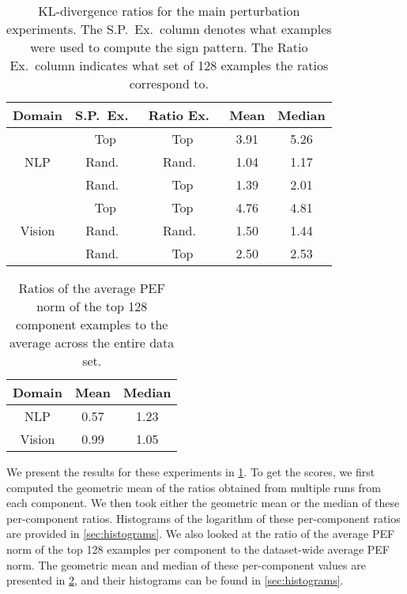 \documentclass[dvipsnames]{article}
\begin{document}
\begin{table}[t]
\caption{%
KL-divergence ratios for the main perturbation experiments. The S.P.\ Ex.\ column denotes what examples were used to compute the sign pattern. The Ratio Ex.\ column indicates what set of 128 examples the ratios correspond to.}
\label{table:h_kl_ratios}
\vskip 0.15in
\begin{center}
\begin{small}
\begin{sc}
\begin{tabular}{ccccc}
\toprule
Domain & S.P.\ Ex.\ & Ratio Ex.\ & Mean & Median \\
\midrule
  & Top & Top & 3.91 & 5.26 \\
NLP & Rand.\ & Rand.\ & 1.04 & 1.17 \\
 & Rand.\ & Top & 1.39 & 2.01 \\
\midrule
  & Top & Top & 4.76 & 4.81 \\
Vision & Rand.\ & Rand.\ & 1.50 & 1.44 \\
 & Rand.\ & Top & 2.50 & 2.53 \\
\bottomrule
\end{tabular}
\end{sc}
\end{small}
\end{center}
\vskip -0.1in
\end{table}

\begin{table}[t]
\caption{Ratios of the average PEF norm of the top 128 component examples to the average across the entire data set.}
\label{table:pef_ratios}
\vskip 0.15in
\begin{center}
\begin{small}
\begin{sc}
\begin{tabular}{ccc}
\toprule
Domain & Mean & Median \\
\midrule
NLP & 0.57 & 1.23 \\
Vision & 0.99 & 1.05 \\
\bottomrule
\end{tabular}
\end{sc}
\end{small}
\end{center}
\vskip -0.1in
\end{table}

We present the results for these experiments in \cref{table:h_kl_ratios}.
To get the scores, we first computed the geometric mean of the ratios obtained from multiple runs from each component.
We then took either the geometric mean or the median of these per-component ratios.
Histograms of the logarithm of these per-component ratios are provided in \cref{sec:histograms}.
We also looked at the ratio of the average PEF norm of the top 128 examples per component to the dataset-wide average PEF norm.
The geometric mean and median of these per-component values are presented in \cref{table:pef_ratios}, and their histograms can be found in \cref{sec:histograms}.
\end{document}
